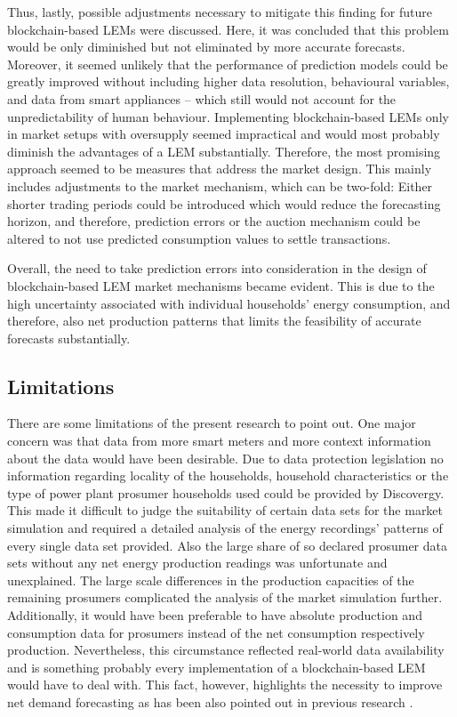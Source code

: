 Thus, lastly, possible adjustments necessary to mitigate this finding for future blockchain-based LEMs were discussed. Here, it was concluded that this problem would be only diminished but not eliminated by more accurate forecasts. Moreover, it seemed unlikely that the performance of prediction models could be greatly improved without including higher data resolution, behavioural variables, and data from smart appliances -- which still would not account for the unpredictability of human behaviour. Implementing blockchain-based LEMs only in market setups with oversupply seemed impractical and would most probably diminish the advantages of a LEM substantially. Therefore, the most promising approach seemed to be measures that address the market design. This mainly includes adjustments to the market mechanism, which can be two-fold: Either shorter trading periods could be introduced which would reduce the forecasting horizon, and therefore, prediction errors or the auction mechanism could be altered to not use predicted consumption values to settle transactions.

Overall, the need to take prediction errors into consideration in the design of blockchain-based LEM market mechanisms became evident. This is due to the high uncertainty associated with individual households' energy consumption, and therefore, also net production patterns that limits the feasibility of accurate forecasts substantially.




\subsection{Limitations}\label{Sec:Conclusion;Subsec:Discussion}

There are some limitations of the present research to point out. One major concern was that data from more smart meters and more context information about the data would have been desirable. Due to data protection legislation no information regarding locality of the households, household characteristics or the type of power plant prosumer households used could be provided by Discovergy. This made it difficult to judge the suitability of certain data sets for the market simulation and required a detailed analysis of the energy recordings' patterns of every single data set provided. Also the large share of so declared prosumer data sets without any net energy production readings was unfortunate and unexplained. The large scale differences in the production capacities of the remaining prosumers complicated the analysis of the market simulation further. Additionally, it would have been preferable to have absolute production and consumption data for prosumers instead of the net consumption respectively production. Nevertheless, this circumstance reflected real-world data availability and is something probably every implementation of a blockchain-based LEM would have to deal with. This fact, however, highlights the necessity to improve net demand forecasting as has been also pointed out in previous research \citep[e.g.,][]{Meer:2018, Hong:2016}.

